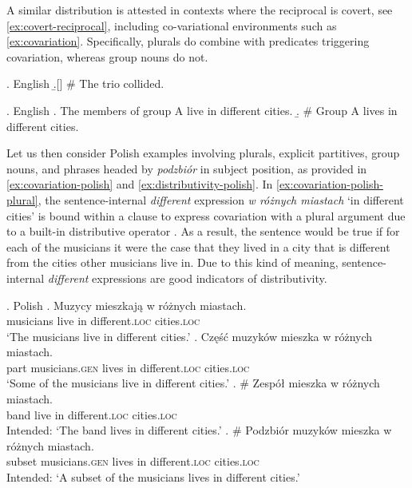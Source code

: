 A similar distribution is attested in contexts where the reciprocal is covert, see \ref{ex:covert-reciprocal}, including co-variational environments such as \ref{ex:covariation}. Specifically, plurals do combine with predicates triggering covariation, whereas group nouns do not. 

\ex.\label{ex:covert-reciprocal} English \citep{dougherty1970grammar}
\b.[] \# The trio collided. 

\ex.\label{ex:covariation} English \citep[p. 168]{schwarzschild1996pluralities}
\a. The members of group A live in different cities.\label{ex:covariation-plural}
\b. \# Group A lives in different cities.\label{ex:covariation-group}

Let us then consider Polish examples involving plurals, explicit partitives, group nouns, and phrases headed by \textit{podzbiór} in subject position, as provided in \ref{ex:covariation-polish} and \ref{ex:distributivity-polish}. In \ref{ex:covariation-polish-plural}, the sentence-internal \textit{different} expression \textit{w różnych miastach} `in different cities' is bound within a clause to express covariation with a plural argument due to a built-in distributive operator \citep{carlson1987same,beck2000semantics,brasoveanu2008sentence,dotlacil2010anaphora}. As a result, the sentence would be true if for each of the musicians it were the case that they lived in a city that is different from the cities other musicians live in. Due to this kind of meaning, sentence-internal \textit{different} expressions are good indicators of distributivity.\largerpage

    \ex. Polish\label{ex:covariation-polish} 
    \ag. Muzycy mieszkają w różnych miastach.\label{ex:covariation-polish-plural}\\
	musicians live in different\textsc{.loc} cities\textsc{.loc}\\
	`The musicians live in different cities.'
	\bg. Część muzyków mieszka w różnych miastach.\label{ex:covariation-polish-part}\\
	part musicians\textsc{.gen} lives in different\textsc{.loc} cities\textsc{.loc}\\
	`Some of the musicians live in different cities.'
	\bg. \# Zespół mieszka w różnych miastach.\label{ex:covariation-polish-group}\\
	band live in different\textsc{.loc} cities\textsc{.loc}\\
	Intended: `The band lives in different cities.'
    \bg. \# Podzbiór muzyków mieszka w różnych miastach.\label{ex:covariation-polish-subset}\\
	subset musicians\textsc{.gen} lives in different\textsc{.loc} cities\textsc{.loc}\\
	Intended: `A subset of the musicians lives in different cities.'

